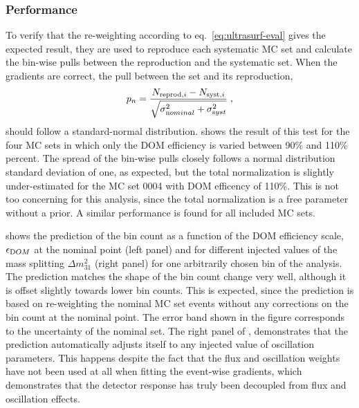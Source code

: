 \subsubsection{Performance}
To verify that the re-weighting according to eq.~\ref{eq:ultrasurf-eval} gives the expected result, they are used to reproduce each systematic MC set and calculate the bin-wise pulls between the reproduction and the systematic set. When the gradients are correct, the pull between the set and its reproduction,
$$p_n = \frac{N_{\mathrm{reprod}, i} - N_{\mathrm{syst}, i}}{\sqrt{\sigma^2_{\rm nominal} + \sigma^2_{\rm syst}}}\;,$$
should follow a standard-normal distribution.  shows the result of this test for the four MC sets in which only the DOM efficiency is varied between 90\% and 110\% percent. The spread of the bin-wise pulls closely follows a normal distribution standard deviation of one, as expected, but the total normalization is slightly under-estimated for the MC set 0004 with DOM efficency of 110\%. This is not too concerning for this analysis, since the total normalization is a free parameter without a prior. A similar performance is found for all included MC sets. 

 shows the prediction of the bin count as a function of the DOM efficiency scale, $\epsilon_{\rm DOM}$ at the nominal point (left panel) and for different injected values of the mass splitting $\Delta m^2_{31}$ (right panel) for one arbitrarily chosen bin of the analysis. The prediction matches the shape of the bin count change very well, although it is offset slightly towards lower bin counts. This is expected, since the prediction is based on re-weighting the nominal MC set events without any corrections on the bin count at the nominal point. The error band shown in the figure corresponds to the uncertainty of the nominal set. The right panel of , demonstrates that the prediction automatically adjusts itself to any injected value of oscillation parameters. This happens despite the fact that the flux and oscillation weights have not been used at all when fitting the event-wise gradients, which demonstrates that the detector response has truly been decoupled from flux and oscillation effects. 

